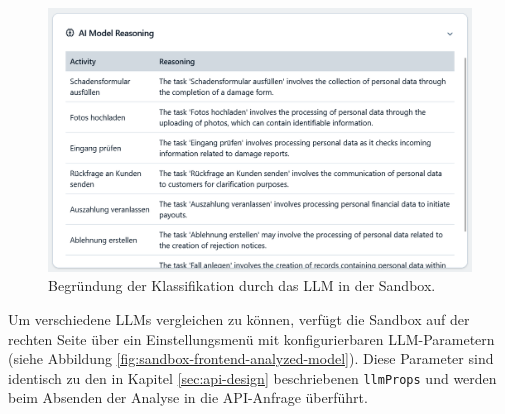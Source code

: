 \begin{figure}
    \centering
    \includegraphics[width=\linewidth]{images/sandbox/sandbox-ai-reasoning}
    \caption{Begründung der Klassifikation durch das LLM in der Sandbox.}
    \label{fig:sandbox-frontend-ai-reasoning}
\end{figure}

Um verschiedene \acp{LLM} vergleichen zu können, verfügt die Sandbox auf der rechten Seite über ein Einstellungsmenü mit konfigurierbaren \ac{LLM}-Parametern (siehe Abbildung \ref{fig:sandbox-frontend-analyzed-model}). Diese Parameter sind identisch zu den in Kapitel \ref{sec:api-design} beschriebenen \texttt{llmProps} und werden beim Absenden der Analyse in die API-Anfrage überführt.
